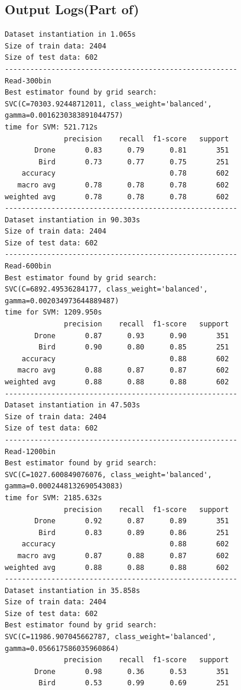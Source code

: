 \documentclass{cta-author}
\begin{document}
\subsection{Output Logs(Part of)}
\lstset{language = Matlab}
\begin{lstlisting}
Dataset instantiation in 1.065s
Size of train data: 2404
Size of test data: 602
-------------------------------------------------------
Read-300bin
Best estimator found by grid search:
SVC(C=70303.92448712011, class_weight='balanced', gamma=0.0016230383891044757)
time for SVM: 521.712s
              precision    recall  f1-score   support
       Drone       0.83      0.79      0.81       351
        Bird       0.73      0.77      0.75       251
    accuracy                           0.78       602
   macro avg       0.78      0.78      0.78       602
weighted avg       0.78      0.78      0.78       602
-------------------------------------------------------
Dataset instantiation in 90.303s
Size of train data: 2404
Size of test data: 602
-------------------------------------------------------
Read-600bin
Best estimator found by grid search:
SVC(C=6892.49536284177, class_weight='balanced', gamma=0.002034973644889487)
time for SVM: 1209.950s
              precision    recall  f1-score   support
       Drone       0.87      0.93      0.90       351
        Bird       0.90      0.80      0.85       251
    accuracy                           0.88       602
   macro avg       0.88      0.87      0.87       602
weighted avg       0.88      0.88      0.88       602
-------------------------------------------------------
Dataset instantiation in 47.503s
Size of train data: 2404
Size of test data: 602
-------------------------------------------------------
Read-1200bin
Best estimator found by grid search:
SVC(C=1027.600849076076, class_weight='balanced', gamma=0.0002448132690543083)
time for SVM: 2185.632s
              precision    recall  f1-score   support
       Drone       0.92      0.87      0.89       351
        Bird       0.83      0.89      0.86       251
    accuracy                           0.88       602
   macro avg       0.87      0.88      0.87       602
weighted avg       0.88      0.88      0.88       602
-------------------------------------------------------
Dataset instantiation in 35.858s
Size of train data: 2404
Size of test data: 602
Best estimator found by grid search:
SVC(C=11986.907045662787, class_weight='balanced', gamma=0.056617586035960864)
              precision    recall  f1-score   support
       Drone       0.98      0.36      0.53       351
        Bird       0.53      0.99      0.69       251

\end{lstlisting}
\end{document}
